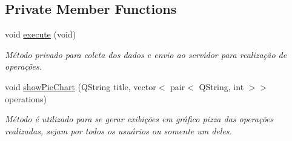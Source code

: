\subsection*{Private Member Functions}
\begin{DoxyCompactItemize}
\item 
void \hyperlink{classMyCalcWindow_a734b9dd51ee199d930855444695625c7}{execute} (void)
\begin{DoxyCompactList}\small\item\em Método privado para coleta dos dados e envio ao servidor para realização de operações. \end{DoxyCompactList}\item 
void \hyperlink{classMyCalcWindow_ade7d295cb55effe865349b7eef1a6d1a}{show\+Pie\+Chart} (Q\+String title, vector$<$ pair$<$ Q\+String, int $>$$>$ operations)
\begin{DoxyCompactList}\small\item\em Método é utilizado para se gerar exibições em gráfico pizza das operações realizadas, sejam por todos os usuários ou somente um deles. \end{DoxyCompactList}\end{DoxyCompactItemize}
